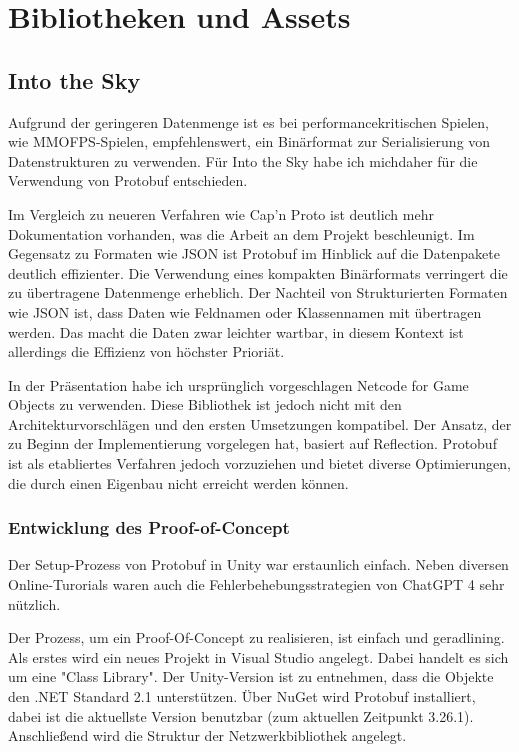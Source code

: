 \chapter{Bibliotheken und Assets}

\section{Into the Sky}

Aufgrund der geringeren Datenmenge ist es bei performancekritischen Spielen, wie MMOFPS-Spielen, empfehlenswert, ein Binärformat zur Serialisierung von Datenstrukturen zu verwenden. Für Into the Sky habe ich michdaher für die Verwendung von Protobuf entschieden.

Im Vergleich zu neueren Verfahren wie Cap'n Proto ist deutlich mehr Dokumentation vorhanden, was die Arbeit an dem Projekt beschleunigt. Im Gegensatz zu Formaten wie JSON ist Protobuf im Hinblick auf die Datenpakete deutlich effizienter. Die Verwendung eines kompakten Binärformats verringert die zu übertragene Datenmenge erheblich. Der Nachteil von Strukturierten Formaten wie JSON ist, dass Daten wie Feldnamen oder Klassennamen mit übertragen werden. Das macht die Daten zwar leichter wartbar, in diesem Kontext ist allerdings die Effizienz von höchster Prioriät.

In der Präsentation habe ich ursprünglich vorgeschlagen Netcode for Game Objects zu verwenden. Diese Bibliothek ist jedoch nicht mit den Architekturvorschlägen und den ersten Umsetzungen kompatibel. Der Ansatz, der zu Beginn der Implementierung vorgelegen hat, basiert auf Reflection. Protobuf ist als etabliertes Verfahren jedoch vorzuziehen und bietet diverse Optimierungen, die durch einen Eigenbau nicht erreicht werden können.

\subsection{Entwicklung des Proof-of-Concept}

Der Setup-Prozess von Protobuf in Unity war erstaunlich einfach. Neben diversen Online-Turorials waren auch die Fehlerbehebungsstrategien von ChatGPT 4 sehr nützlich.

Der Prozess, um ein Proof-Of-Concept zu realisieren, ist einfach und geradlining. Als erstes wird ein  neues Projekt in Visual Studio angelegt. Dabei handelt es sich um eine "Class Library". Der Unity-Version ist zu entnehmen, dass die Objekte den .NET Standard 2.1 unterstützen. Über NuGet wird Protobuf installiert, dabei ist die aktuellste Version benutzbar (zum aktuellen Zeitpunkt 3.26.1). Anschließend wird die Struktur der Netzwerkbibliothek angelegt.

